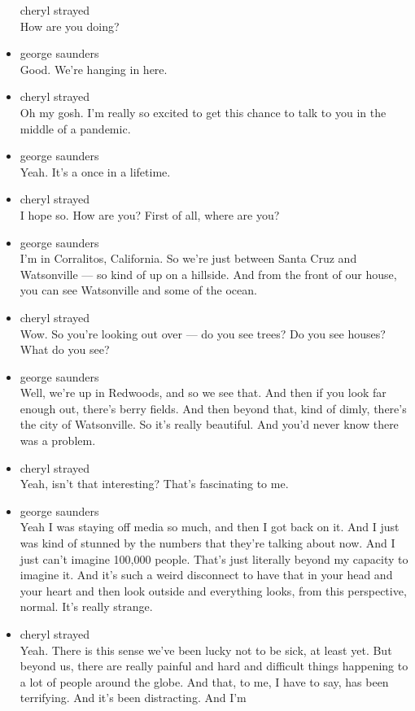 \begin{itemize}
  cheryl strayed\\
  How are you doing?
\item
  george saunders\\
  Good. We're hanging in here.
\item
  cheryl strayed\\
  Oh my gosh. I'm really so excited to get this chance to talk to you in
  the middle of a pandemic.
\item
  george saunders\\
  Yeah. It's a once in a lifetime.
\item
  cheryl strayed\\
  I hope so. How are you? First of all, where are you?
\item
  george saunders\\
  I'm in Corralitos, California. So we're just between Santa Cruz and
  Watsonville --- so kind of up on a hillside. And from the front of our
  house, you can see Watsonville and some of the ocean.
\item
  cheryl strayed\\
  Wow. So you're looking out over --- do you see trees? Do you see
  houses? What do you see?
\item
  george saunders\\
  Well, we're up in Redwoods, and so we see that. And then if you look
  far enough out, there's berry fields. And then beyond that, kind of
  dimly, there's the city of Watsonville. So it's really beautiful. And
  you'd never know there was a problem.
\item
  cheryl strayed\\
  Yeah, isn't that interesting? That's fascinating to me.
\item
  george saunders\\
  Yeah I was staying off media so much, and then I got back on it. And I
  just was kind of stunned by the numbers that they're talking about
  now. And I just can't imagine 100,000 people. That's just literally
  beyond my capacity to imagine it. And it's such a weird disconnect to
  have that in your head and your heart and then look outside and
  everything looks, from this perspective, normal. It's really strange.
\item
  cheryl strayed\\
  Yeah. There is this sense we've been lucky not to be sick, at least
  yet. But beyond us, there are really painful and hard and difficult
  things happening to a lot of people around the globe. And that, to me,
  I have to say, has been terrifying. And it's been distracting. And I'm

\end{itemize}
